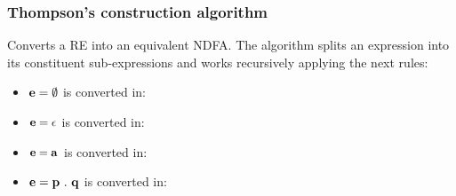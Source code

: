 \subsubsection{Thompson's construction algorithm}
Converts a RE into an equivalent NDFA. The algorithm splits an expression into its constituent sub-expressions and works recursively applying the next rules: 

\begin{itemize}
    \item  $\bf e = \emptyset$ is converted in:
    \begin{figure}[H]
        \begin{center}
        \end{center} 
    \end{figure}
    
    \item $\bf e = \epsilon$  is converted in:
    \begin{figure}[H]
        \begin{center}
        \end{center} 
    \end{figure}
    
    \item  $\bf e = a$ is converted in:
    \begin{figure}[H]
        \begin{center}
        \end{center} 
    \end{figure}
    
    \item  $\bf e = p\ .\ q$ is converted in:
    \begin{figure}[H]
        \begin{center}
        \end{center} 
    \end{figure}
    

\end{itemize}
